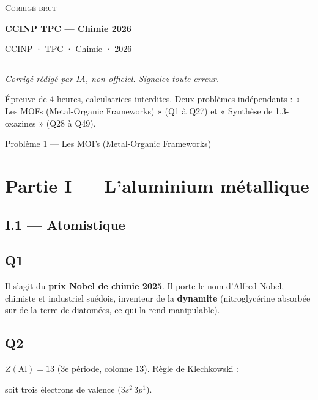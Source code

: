 \documentclass[11pt,a4paper]{article}
\newcommand{\equationajustee}[1]{%
  \sbox{\boiteequation}{$\displaystyle #1$}%
  \ifdim\wd\boiteequation>\linewidth
    \[\resizebox{\linewidth}{!}{\usebox{\boiteequation}}\]%
  \else
    \[#1\]%
  \fi}
\begin{document}
\thispagestyle{plain}
\begin{center}
  {\small\scshape Corrigé brut}\par\smallskip
  {\LARGE\bfseries CCINP TPC — Chimie 2026\par}\medskip
  {\large CCINP · TPC · Chimie · 2026\par}
\end{center}
\vspace{2pt}\hrule\vspace{8pt}

\emph{Corrigé rédigé par IA, non officiel. Signalez toute erreur.}

Épreuve de 4 heures, calculatrices interdites. Deux problèmes indépendants : « Les MOFs (Metal-Organic Frameworks) » (Q1 à Q27) et « Synthèse de 1,3-oxazines » (Q28 à Q49).

Problème 1 --- Les MOFs (Metal-Organic Frameworks)

\hypertarget{partie-i-laluminium-muxe9tallique}{%
\section{Partie I --- L'aluminium métallique}\label{partie-i-laluminium-muxe9tallique}}

\hypertarget{i.1-atomistique}{%
\subsection{I.1 --- Atomistique}\label{i.1-atomistique}}

\hypertarget{q1}{%
\subsection{Q1}\label{q1}}

Il s'agit du \textbf{prix Nobel de chimie 2025}. Il porte le nom d'Alfred Nobel, chimiste et industriel suédois, inventeur de la \textbf{dynamite} (nitroglycérine absorbée sur de la terre de diatomées, ce qui la rend manipulable).

\hypertarget{q2}{%
\subsection{Q2}\label{q2}}

\(Z(\mathrm{Al})=13\) (3e période, colonne 13). Règle de Klechkowski :

\equationajustee{\boxed{\mathrm{Al}:\ 1s^2\,2s^2\,2p^6\,3s^2\,3p^1}}

soit trois électrons de valence (\(3s^2\,3p^1\)).
\end{document}
